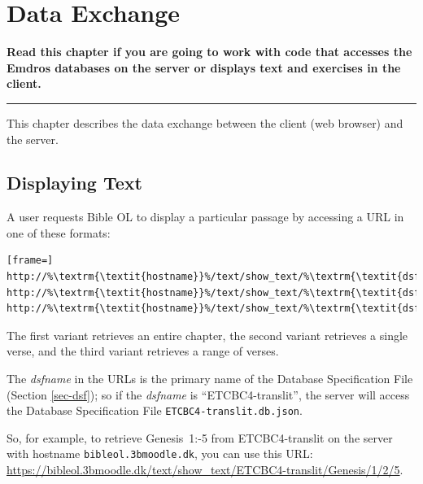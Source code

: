 \documentclass[11pt,oneside,a4paper]{memoir}
\newcommand*{\bibleref}[3]{#1~#2\thinspace:\thinspace#3}
\begin{document}
\chapter{Data Exchange}\label{chap-data-exchange}

\textbf{Read this chapter if you are going to work with code that accesses the Emdros databases on
  the server or displays text and exercises in the client.}
\plainbreak{3}

This chapter describes the data exchange between the client (web browser)
and the server.

\section{Displaying Text}\label{displaying-text}

A user requests Bible OL to display a particular passage by accessing a URL%
in one of these formats:

\begin{lstlisting}[frame=]
http://%\textrm{\textit{hostname}}%/text/show_text/%\textrm{\textit{dsfname}}%/%\textrm{\textit{book}}%/%\textrm{\textit{chapter}}%
http://%\textrm{\textit{hostname}}%/text/show_text/%\textrm{\textit{dsfname}}%/%\textrm{\textit{book}}%/%\textrm{\textit{chapter}}%/%\textrm{\textit{verse}}%
http://%\textrm{\textit{hostname}}%/text/show_text/%\textrm{\textit{dsfname}}%/%\textrm{\textit{book}}%/%\textrm{\textit{chapter}}%/%\textrm{\textit{firstverse}}%/%\textrm{\textit{lastverse}}%
\end{lstlisting}

The first variant retrieves an entire chapter, the second variant retrieves a single verse, and the
third variant retrieves a range of verses.

The \emph{dsfname} in the URLs is the primary name of the Database Specification File%
(Section \ref{sec-dsf}); so if the \emph{dsfname} is ``ETCBC4-translit'', the
server will access the Database Specification File \texttt{ETCBC4-translit.db.json}.

So, for example, to retrieve \bibleref{Genesis}{1}{2-5} from ETCBC4-translit on the
server with hostname \texttt{bibleol.3bmoodle.dk}, you can use this URL:
\url{https://bibleol.3bmoodle.dk/text/show_text/ETCBC4-translit/Genesis/1/2/5}.
\end{document}
